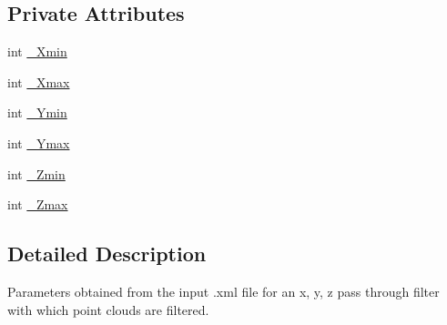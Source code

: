 \subsection*{Private Attributes}
\begin{DoxyCompactItemize}
\item 
int \hyperlink{classPassThroughFilterParameters_a226e728cdcf8ab6da1aa1c07325eafd0}{\-\_\-\-Xmin}
\item 
int \hyperlink{classPassThroughFilterParameters_aa53af7a98c535341396cc54293ed83ed}{\-\_\-\-Xmax}
\item 
int \hyperlink{classPassThroughFilterParameters_a42c4e2f4ca63a8abe1a6ab6a5bcce360}{\-\_\-\-Ymin}
\item 
int \hyperlink{classPassThroughFilterParameters_a9f699ba4af0b42b21b561e47128cf94e}{\-\_\-\-Ymax}
\item 
int \hyperlink{classPassThroughFilterParameters_ad11727c9de1a3cbd024ebcf657f01567}{\-\_\-\-Zmin}
\item 
int \hyperlink{classPassThroughFilterParameters_a17a5cb0a726473f5a71d193a098858f0}{\-\_\-\-Zmax}
\end{DoxyCompactItemize}


\subsection{Detailed Description}
Parameters obtained from the input .xml file for an x, y, z pass through filter with which point clouds are filtered. 

